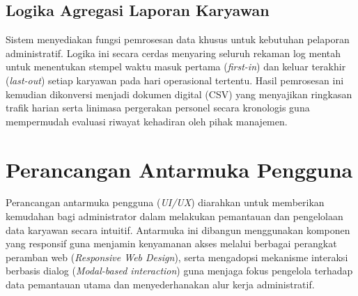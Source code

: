 \subsection{Logika Agregasi Laporan Karyawan}
Sistem menyediakan fungsi pemrosesan data khusus untuk kebutuhan pelaporan administratif. Logika ini secara cerdas menyaring seluruh rekaman log mentah untuk menentukan stempel waktu masuk pertama (\textit{first-in}) dan keluar terakhir (\textit{last-out}) setiap karyawan pada hari operasional tertentu. Hasil pemrosesan ini kemudian dikonversi menjadi dokumen digital (CSV) yang menyajikan ringkasan trafik harian serta linimasa pergerakan personel secara kronologis guna mempermudah evaluasi riwayat kehadiran oleh pihak manajemen.

\section{Perancangan Antarmuka Pengguna}
Perancangan antarmuka pengguna (\textit{UI/UX}) diarahkan untuk memberikan kemudahan bagi administrator dalam melakukan pemantauan dan pengelolaan data karyawan secara intuitif. Antarmuka ini dibangun menggunakan komponen yang responsif guna menjamin kenyamanan akses melalui berbagai perangkat peramban web (\textit{Responsive Web Design}), serta mengadopsi mekanisme interaksi berbasis dialog (\textit{Modal-based interaction}) guna menjaga fokus pengelola terhadap data pemantauan utama dan menyederhanakan alur kerja administratif.

